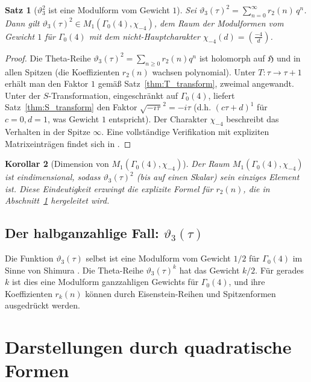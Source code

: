 \documentclass[12pt,a4paper]{amsart}
\newtheorem{theorem}{Satz}[section]
\newtheorem{corollary}[theorem]{Korollar}
\theoremstyle{definition}
\begin{document}
\begin{theorem}[$\vartheta_3^2$ ist eine Modulform vom Gewicht $1$]\label{thm:theta3_weight1}
Sei $\vartheta_3(\tau)^2 = \sum_{n=0}^{\infty} r_2(n)\, q^n$.
Dann gilt $\vartheta_3(\tau)^2 \in M_1(\Gamma_0(4), \chi_{-4})$,
dem Raum der Modulformen vom Gewicht $1$ für $\Gamma_0(4)$
mit dem nicht-Hauptcharakter $\chi_{-4}(d) = \left(\frac{-4}{d}\right)$.
\end{theorem}

\begin{proof}
Die Theta-Reihe $\vartheta_3(\tau)^2 = \sum_{n\geq 0} r_2(n) q^n$
ist holomorph auf $\mathfrak{H}$ und in allen Spitzen (die Koeffizienten $r_2(n)$
wachsen polynomial).  Unter $T: \tau\to\tau+1$ erhält man den Faktor $1$ gemäß
Satz~\ref{thm:T_transform}, zweimal angewandt.
Unter der $S$-Transformation, eingeschränkt auf $\Gamma_0(4)$, liefert
Satz~\ref{thm:S_transform} den Faktor $\sqrt{-i\tau}^{\,2} = -i\tau$
(d.h. $(c\tau+d)^1$ für $c=0, d=1$, was Gewicht $1$ entspricht).
Der Charakter $\chi_{-4}$ beschreibt das Verhalten in der Spitze $\infty$.
Eine vollständige Verifikation mit expliziten Matrixeinträgen findet sich in \cite{Iwaniec1997}.
\end{proof}

\begin{corollary}[Dimension von $M_1(\Gamma_0(4),\chi_{-4})$]
Der Raum $M_1(\Gamma_0(4),\chi_{-4})$ ist eindimensional, sodass
$\vartheta_3(\tau)^2$ (bis auf einen Skalar) sein einziges Element ist.
Diese Eindeutigkeit erzwingt die explizite Formel für $r_2(n)$, die in
Abschnitt~\ref{sec:quadratic} hergeleitet wird.
\end{corollary}

\subsection{Der halbganzahlige Fall: $\vartheta_3(\tau)$}

Die Funktion $\vartheta_3(\tau)$ selbst ist eine Modulform vom Gewicht $1/2$
für $\Gamma_0(4)$ im Sinne von Shimura \cite{Shimura1973}.
Die Theta-Reihe $\vartheta_3(\tau)^k$ hat das Gewicht $k/2$.
Für gerades $k$ ist dies eine Modulform ganzzahligen Gewichts für $\Gamma_0(4)$,
und ihre Koeffizienten $r_k(n)$ können durch Eisenstein-Reihen und Spitzenformen ausgedrückt werden.

\section{Darstellungen durch quadratische Formen}\label{sec:quadratic}
\end{document}
